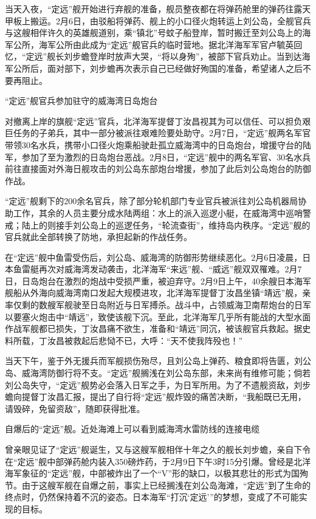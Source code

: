 \documentclass[12pt,UTF8]{ctexbook}
\begin{document}
当天入夜，“定远”舰开始进行弃舰的准备，舰员整夜都在将弹药舱里的弹药往露天甲板上搬运。2月6日，由驳船将弹药、舰上的小口径火炮转运上刘公岛，全舰官兵与这艘相伴许久的英雄舰道别，乘“镇北”号蚊子船登岸，暂时搬迁至刘公岛上的海军公所，海军公所由此成为“定远”舰官兵的临时营地。据北洋海军军官卢毓英回忆，“定远”舰长刘步蟾登岸时放声大哭，“将以身殉”，被部下官兵劝止。当到达海军公所后，面对部下，刘步蟾再次表示自己已经做好殉国的准备，希望诸人之后不要再阻止。


“定远”舰官兵参加驻守的威海湾日岛炮台

对撤离上岸的旗舰“定远”官兵，北洋海军提督丁汝昌视其为可以信任、可以担负艰巨任务的子弟兵，其中一部分被派往艰难险要处助守。2月7日，“定远”舰两名军官带领30名水兵，携带小口径火炮乘船驶赴孤立威海湾中的日岛炮台，增援守台的陆军，参加了至为激烈的日岛炮台恶战。2月8日，“定远”舰中的两名军官、30名水兵前往直接面对外海日舰攻击的刘公岛东部炮台增援，参加了此后刘公岛炮台的防御作战。

“定远”舰剩下的200余名官兵，除了部分轮机部门专业官兵被派往刘公岛机器局协助工作，其余的人员主要分成水陆两组：水上的派入巡逻小艇，在威海湾中巡哨警戒；陆上的则接手刘公岛上的巡逻任务，“轮流查街”，维持岛内秩序。“定远”舰的官兵就此全部转换了防地，承担起新的作战任务。

在“定远”舰中鱼雷受伤后，刘公岛、威海湾的防御形势继续恶化。2月6日凌晨，日本鱼雷艇再次对威海湾发动袭击，北洋海军“来远”舰、“威远”舰双双罹难。2月7日，日岛炮台在激烈的炮战中受损严重，被迫弃守。2月9日上午，40余艘日本海军舰船从外海向威海湾南口发起大规模进攻，北洋海军提督丁汝昌坐镇“靖远”舰，亲率仅剩的数艘军舰驶至日岛附近与日军搏杀。战斗中，占领威海卫南帮炮台的日军以要塞火炮击中“靖远”，致使该舰下沉。至此，北洋海军几乎所有能战的大型水面作战军舰都已损失，丁汝昌痛不欲生，准备和“靖远”同沉，被该舰官兵救起。据史料所载，丁汝昌被救起后悲恸不已，大呼：“天不使我阵殁也！”

当天下午，鉴于外无援兵而军舰损伤殆尽，且刘公岛上弹药、粮食即将告匮，刘公岛、威海湾防御行将不支。“定远”舰搁浅在刘公岛东部，未来尚有维修可能；倘若刘公岛失守，“定远”舰势必会落入日军之手，为日军所用。为了不遗舰资敌，刘步蟾向提督丁汝昌汇报，提出了自行将“定远”舰炸毁的痛苦决断，“我船既已无用，请毁碎，免留资敌”，随即获得批准。


自爆后的“定远”舰。近处海滩上可以看到威海湾水雷防线的连接电缆

曾亲眼见证了“定远”舰诞生，又与这艘军舰相伴十年之久的舰长刘步蟾，亲自下令在“定远”舰中部弹药舱内装入350磅炸药，于2月9日下午3时15分引爆。曾经是北洋海军象征的“定远”舰，中部被炸出了一个“V”形的缺口，以极其悲壮的形式为国殉节。由于这艘军舰在自爆之前，事实上已经搁浅在刘公岛海滩，“定远”到了生命的终点时，仍然保持着不沉的姿态。日本海军“打沉‘定远’”的梦想，变成了不可能实现的目标。
\end{document}
